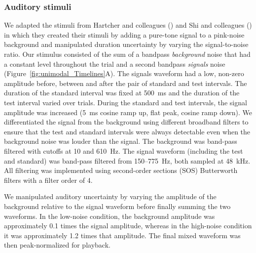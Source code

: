 \documentclass{jov}
\providecommand{\citeyearpar}[1]{(\citeyear{#1})}
\begin{document}

\subsubsection{Auditory stimuli}

We adapted the stimuli from Hartcher and colleagues \citeyearpar{hartcher2014duration} and Shi and colleagues \citeyearpar{shi2013reducing} in which they created their stimuli by adding a pure-tone signal to a pink-noise background and manipulated duration uncertainty by varying the signal-to-noise ratio. Our stimulus consisted of the sum of a bandpass {\em background} noise that had a constant level throughout the trial and a second bandpass {\em signals} noise (Figure~\ref{fig:unimodal_Timelines}A). The signals waveform had a low, non-zero amplitude before, between and after the pair of standard and test intervals. The duration of the standard interval was fixed at 500~ms and the duration of the test interval varied over trials. During the standard and test intervals, the signal amplitude was increased (5~ms cosine ramp up, flat peak, cosine ramp down). We differentiated the signal from the background using different broadband filters to ensure that the test and standard intervals were always detectable even when the background noise was louder than the signal. The background was band-pass filtered with cutoffs at 10 and 610~Hz. The signal waveform (including the test and standard) was band-pass filtered from 150--775~Hz, both sampled at 48~kHz. All filtering was implemented using second-order sections (SOS) Butterworth filters with a filter order of 4.

We manipulated auditory uncertainty by varying the amplitude of the background relative to the signal waveform before finally summing the two waveforms. In the low-noise condition, the background amplitude was approximately 0.1 times the signal amplitude, whereas in the high-noise condition it was approximately 1.2 times that amplitude. The final mixed waveform was then peak-normalized for playback.
\end{document}
